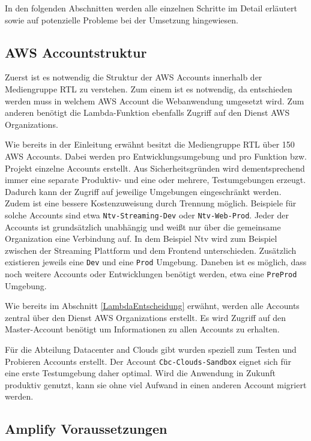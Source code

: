 In den folgenden Abschnitten werden alle einzelnen Schritte im Detail erläutert sowie auf potenzielle Probleme bei der Umsetzung hingewiesen.

\subsection{AWS Accountstruktur }

Zuerst ist es notwendig die Struktur der AWS Accounts innerhalb der Mediengruppe RTL zu verstehen.
Zum einem ist es notwendig, da entschieden werden muss in welchem AWS Account die Webanwendung umgesetzt wird.
Zum anderen benötigt die Lambda-Funktion ebenfalls Zugriff auf den Dienst AWS Organizations.

Wie bereits in der Einleitung erwähnt besitzt die Mediengruppe RTL über 150 AWS Accounts.
Dabei werden pro Entwicklungsumgebung und pro Funktion bzw. Projekt einzelne Accounts erstellt.
Aus Sicherheitsgründen wird dementsprechend immer eine separate Produktiv- und eine oder mehrere, Testumgebungen erzeugt.
Dadurch kann der Zugriff auf jeweilige Umgebungen eingeschränkt werden.
Zudem ist eine bessere Kostenzuweisung durch Trennung möglich.
Beispiele für solche Accounts sind etwa \verb+Ntv-Streaming-Dev+ oder \verb+Ntv-Web-Prod+.
Jeder der Accounts ist grundsätzlich unabhängig und weißt nur über die gemeinsame Organization eine Verbindung auf.
In dem Beispiel Ntv wird zum Beispiel zwischen der Streaming Plattform und dem Frontend unterschieden.
Zusätzlich existieren jeweils eine \verb+Dev+ und eine \verb+Prod+ Umgebung.
Daneben ist es möglich, dass noch weitere Accounts oder Entwicklungen benötigt werden, etwa eine \verb+PreProd+ Umgebung.

Wie bereits im Abschnitt \ref{LambdaEntscheidung}  erwähnt, werden alle Accounts zentral über den Dienst AWS Organizations erstellt.
Es wird Zugriff auf den Master-Account benötigt um Informationen zu allen Accounts zu erhalten.

Für die Abteilung Datacenter and Clouds gibt wurden speziell zum Testen und Probieren Accounts erstellt.
Der Account \verb+Cbc-Clouds-Sandbox+ eignet sich für eine erste Testumgebung daher optimal.
Wird die Anwendung in Zukunft produktiv genutzt, kann sie ohne viel Aufwand in einen anderen Account migriert werden.


\subsection{Amplify Voraussetzungen}

